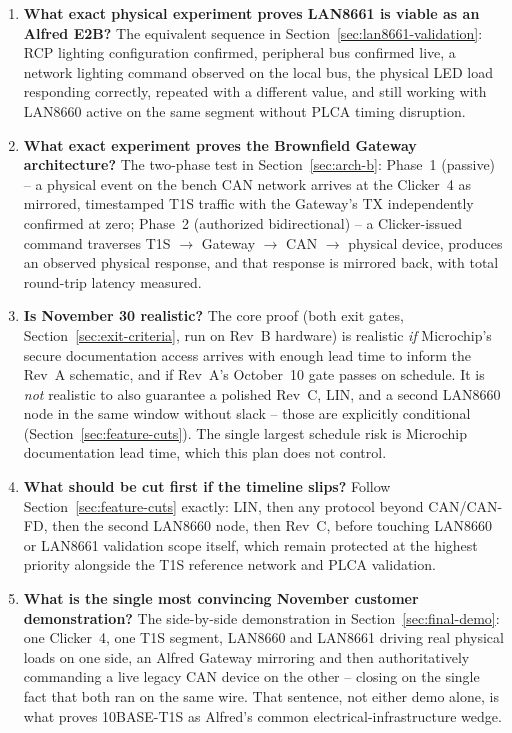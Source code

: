 \begin{enumerate}[itemsep=0.4em]
\item \textbf{What exact physical experiment proves LAN8661 is viable as an Alfred E2B?}
The equivalent sequence in Section~\ref{sec:lan8661-validation}: RCP lighting configuration confirmed, peripheral bus confirmed live, a network lighting command observed on the local bus, the physical LED load responding correctly, repeated with a different value, and still working with LAN8660 active on the same segment without PLCA timing disruption.

\item \textbf{What exact experiment proves the Brownfield Gateway architecture?}
The two-phase test in Section~\ref{sec:arch-b}: Phase~1 (passive) -- a physical event on the bench CAN network arrives at the Clicker~4 as mirrored, timestamped T1S traffic with the Gateway's TX independently confirmed at zero; Phase~2 (authorized bidirectional) -- a Clicker-issued command traverses T1S $\rightarrow$ Gateway $\rightarrow$ CAN $\rightarrow$ physical device, produces an observed physical response, and that response is mirrored back, with total round-trip latency measured.

\item \textbf{Is November 30 realistic?}
The core proof (both exit gates, Section~\ref{sec:exit-criteria}, run on Rev~B hardware) is realistic \emph{if} Microchip's secure documentation access arrives with enough lead time to inform the Rev~A schematic, and if Rev~A's October~10 gate passes on schedule. It is \emph{not} realistic to also guarantee a polished Rev~C, LIN, and a second LAN8660 node in the same window without slack -- those are explicitly conditional (Section~\ref{sec:feature-cuts}). The single largest schedule risk is Microchip documentation lead time, which this plan does not control.

\item \textbf{What should be cut first if the timeline slips?}
Follow Section~\ref{sec:feature-cuts} exactly: LIN, then any protocol beyond CAN/CAN-FD, then the second LAN8660 node, then Rev~C, before touching LAN8660 or LAN8661 validation scope itself, which remain protected at the highest priority alongside the T1S reference network and PLCA validation.

\item \textbf{What is the single most convincing November customer demonstration?}
The side-by-side demonstration in Section~\ref{sec:final-demo}: one Clicker~4, one T1S segment, LAN8660 and LAN8661 driving real physical loads on one side, an Alfred Gateway mirroring and then authoritatively commanding a live legacy CAN device on the other -- closing on the single fact that both ran on the same wire. That sentence, not either demo alone, is what proves 10BASE-T1S as Alfred's common electrical-infrastructure wedge.

\end{enumerate}
